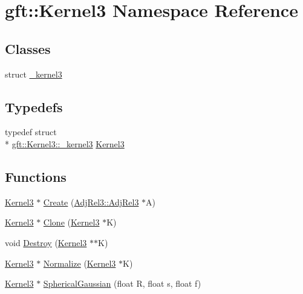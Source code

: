 \hypertarget{namespacegft_1_1Kernel3}{\section{gft\-:\-:Kernel3 Namespace Reference}
\label{namespacegft_1_1Kernel3}
}
\subsection*{Classes}
\begin{DoxyCompactItemize}
\item 
struct \hyperlink{structgft_1_1Kernel3_1_1__kernel3}{\-\_\-kernel3}
\end{DoxyCompactItemize}
\subsection*{Typedefs}
\begin{DoxyCompactItemize}
\item 
typedef struct \\*
\hyperlink{structgft_1_1Kernel3_1_1__kernel3}{gft\-::\-Kernel3\-::\-\_\-kernel3} \hyperlink{namespacegft_1_1Kernel3_a699a3aa3312fdababf590ebcba809922}{Kernel3}
\end{DoxyCompactItemize}
\subsection*{Functions}
\begin{DoxyCompactItemize}
\item 
\hyperlink{namespacegft_1_1Kernel3_a699a3aa3312fdababf590ebcba809922}{Kernel3} $\ast$ \hyperlink{namespacegft_1_1Kernel3_a2c9536ea8f88a5290629867683750318}{Create} (\hyperlink{namespacegft_1_1AdjRel3_a0d54e2f148bf5636f3a3faf70d4eb5ae}{Adj\-Rel3\-::\-Adj\-Rel3} $\ast$A)
\item 
\hyperlink{namespacegft_1_1Kernel3_a699a3aa3312fdababf590ebcba809922}{Kernel3} $\ast$ \hyperlink{namespacegft_1_1Kernel3_a7a361b2f2a1bc31b83776d02091cea88}{Clone} (\hyperlink{namespacegft_1_1Kernel3_a699a3aa3312fdababf590ebcba809922}{Kernel3} $\ast$K)
\item 
void \hyperlink{namespacegft_1_1Kernel3_a9ccc9288e73bec52eccbd8257a8a57f2}{Destroy} (\hyperlink{namespacegft_1_1Kernel3_a699a3aa3312fdababf590ebcba809922}{Kernel3} $\ast$$\ast$K)
\item 
\hyperlink{namespacegft_1_1Kernel3_a699a3aa3312fdababf590ebcba809922}{Kernel3} $\ast$ \hyperlink{namespacegft_1_1Kernel3_addf640e8cbb9c12ad06b34d270a33e10}{Normalize} (\hyperlink{namespacegft_1_1Kernel3_a699a3aa3312fdababf590ebcba809922}{Kernel3} $\ast$K)
\item 
\hyperlink{namespacegft_1_1Kernel3_a699a3aa3312fdababf590ebcba809922}{Kernel3} $\ast$ \hyperlink{namespacegft_1_1Kernel3_ad8e897100309d311fada628cf9e99c93}{Spherical\-Gaussian} (float R, float s, float f)
\end{DoxyCompactItemize}


